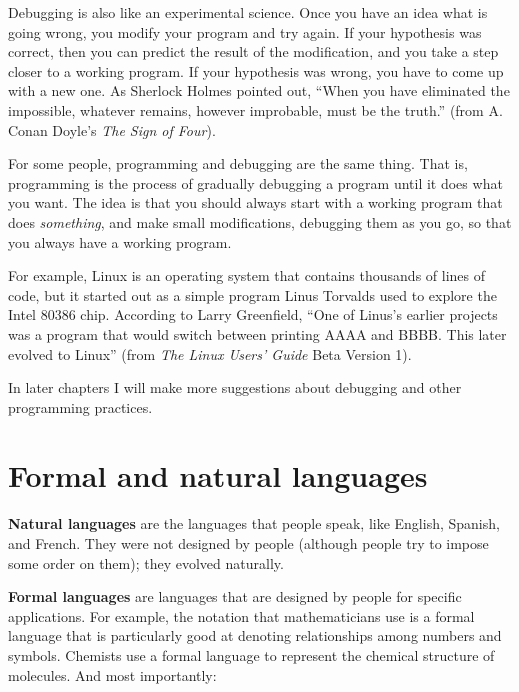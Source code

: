 Debugging is also like an experimental science.  Once you have an idea
what is going wrong, you modify your program and try again.  If your
hypothesis was correct, then you can predict the result of the
modification, and you take a step closer to a working program.  If
your hypothesis was wrong, you have to come up with a new one.  As
Sherlock Holmes pointed out, ``When you have eliminated the
impossible, whatever remains, however improbable, must be the truth.''
(from A. Conan Doyle's {\em The Sign of Four}).


For some people, programming and debugging are the
same thing.  That is, programming is the process of gradually
debugging a program until it does what you want.  The idea
is that you should always start with a working program that
does {\em something}, and make small modifications, debugging
them as you go, so that you always have a working program.

For example, Linux is an operating system that contains thousands of
lines of code, but it started out as a simple program Linus Torvalds
used to explore the Intel 80386 chip.  According to Larry Greenfield,
``One of Linus's earlier projects was a program that would switch
between printing AAAA and BBBB.  This later evolved to Linux''
(from {\em The Linux Users' Guide} Beta Version 1).


In later chapters I will make more suggestions about debugging
and other programming practices.

\section{Formal and natural languages}

{\bf Natural languages} are the languages that people speak,
like English, Spanish, and French.  They were not designed
by people (although people try to impose some order on them);
they evolved naturally.

{\bf Formal languages} are languages that are designed by people for
specific applications.  For example, the notation that mathematicians
use is a formal language that is particularly good at denoting
relationships among numbers and symbols.  Chemists use a formal
language to represent the chemical structure of molecules.  And
most importantly:

